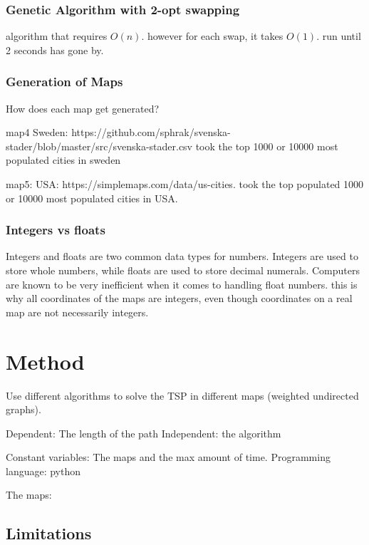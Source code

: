 \documentclass{article}
\begin{document}
\subsubsection{Genetic Algorithm with 2-opt swapping}\label{2-opt swapping}
algorithm that requires $O(n)$. however for each swap, it takes $O(1)$. run until 2 seconds has gone by.


\subsubsection{Generation of Maps}\label{subsubsec1}
How does each map get generated?

map4 Sweden: https://github.com/sphrak/svenska-stader/blob/master/src/svenska-stader.csv  took the top 1000 or 10000 most populated cities in sweden

map5: USA: https://simplemaps.com/data/us-cities. took the top populated 1000 or 10000 most populated cities in USA.


\subsubsection{Integers vs floats}\label{subsubsec1}
Integers and floats are two common data types for numbers. Integers are used to store whole numbers, while floats are used to store decimal numerals. Computers are known to be very inefficient when it comes to handling float numbers.
this is why all coordinates of the maps are integers, even though coordinates on a real map are not necessarily integers. 




\section{Method}\label{sec2}
Use different algorithms to solve the TSP in different maps (weighted undirected graphs).




Dependent: The length of the path
Independent: the algorithm


Constant variables: The maps and the max amount of time. Programming language: python

The maps: 

\subsection{Limitations}\label{subsec3}
\end{document}
